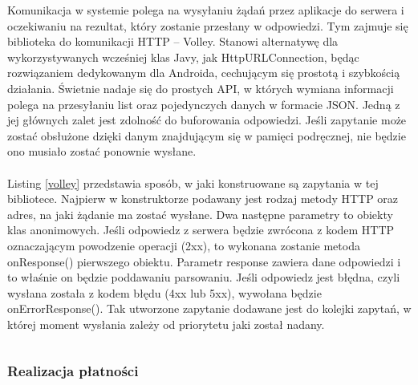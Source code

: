 Komunikacja w systemie polega na wysyłaniu żądań przez aplikacje do serwera i oczekiwaniu na rezultat, który zostanie przesłany w odpowiedzi. Tym zajmuje się biblioteka do komunikacji HTTP -- Volley. Stanowi alternatywę dla wykorzystywanych wcześniej klas Javy, jak HttpURLConnection, będąc rozwiązaniem dedykowanym dla Androida, cechującym się prostotą i szybkością działania. Świetnie nadaje się do prostych API, w których wymiana informacji polega na przesyłaniu list oraz pojedynczych danych w formacie JSON. Jedną z jej głównych zalet jest zdolność do buforowania odpowiedzi. Jeśli zapytanie może zostać obsłużone dzięki danym znajdującym się w pamięci podręcznej, nie będzie ono musiało zostać ponownie wysłane.
\\
\\
Listing \ref{volley} przedstawia sposób, w jaki konstruowane są zapytania w tej bibliotece. Najpierw w konstruktorze podawany jest rodzaj metody HTTP oraz adres, na jaki żądanie ma zostać wysłane. Dwa następne parametry to obiekty klas anonimowych. Jeśli odpowiedz z serwera będzie zwrócona z kodem HTTP oznaczającym powodzenie operacji (2xx), to wykonana zostanie metoda onResponse() pierwszego obiektu. Parametr response zawiera dane odpowiedzi i to właśnie on będzie poddawaniu parsowaniu. Jeśli odpowiedz jest błędna, czyli wysłana została z kodem błędu (4xx lub 5xx), wywołana będzie onErrorResponse(). Tak utworzone zapytanie dodawane jest do kolejki zapytań, w której moment wysłania zależy od priorytetu jaki został nadany.

\begin{singlespace}
	\label{volley}
	\vspace{0.3cm}
	\inputminted[fontsize=\footnotesize, linenos=true]{java}{src/imp/scan-activity.java}
\end{singlespace}

\subsubsection*{Realizacja płatności}

